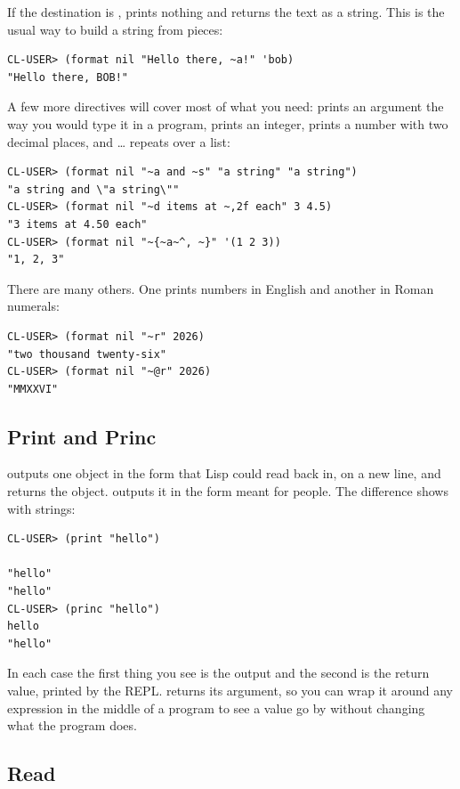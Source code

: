 If the destination is ,  prints nothing and
returns the text as a string. This is the usual way to build a string
from pieces:

\begin{verbatim}
CL-USER> (format nil "Hello there, ~a!" 'bob)
"Hello there, BOB!"
\end{verbatim}

A few more directives will cover most of what you need:
 prints an argument the way you would type it in a
program,  prints an integer,  prints a
number with two decimal places, and \code{\td\{} \ldots{}
\code{\td\}} repeats over a list:

\begin{verbatim}
CL-USER> (format nil "~a and ~s" "a string" "a string")
"a string and \"a string\""
CL-USER> (format nil "~d items at ~,2f each" 3 4.5)
"3 items at 4.50 each"
CL-USER> (format nil "~{~a~^, ~}" '(1 2 3))
"1, 2, 3"
\end{verbatim}

There are many others. One prints numbers in English and another in
Roman numerals:

\begin{verbatim}
CL-USER> (format nil "~r" 2026)
"two thousand twenty-six"
CL-USER> (format nil "~@r" 2026)
"MMXXVI"
\end{verbatim}

\subsection{Print and Princ}

 outputs one object in the form that Lisp could read back
in, on a new line, and returns the object.  outputs it in
the form meant for people. The difference shows with strings:

\begin{verbatim}
CL-USER> (print "hello")

"hello"
"hello"
CL-USER> (princ "hello")
hello
"hello"
\end{verbatim}

In each case the first thing you see is the output and the second is
the return value, printed by the REPL.  returns its
argument, so you can wrap it around any expression in the middle of a
program to see a value go by without changing what the program does.

\subsection{Read}

